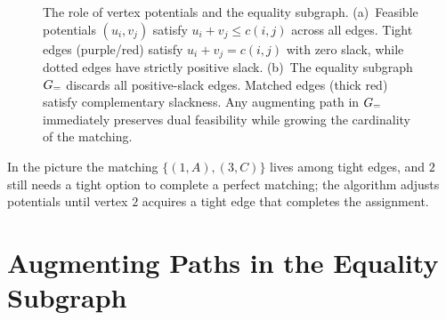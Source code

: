 \begin{figure}[H]
\caption{The role of vertex potentials and the equality subgraph. (a)~Feasible
potentials $(u_i, v_j)$ satisfy $u_i + v_j \le c(i,j)$ across all edges. Tight
edges (purple/red) satisfy $u_i + v_j = c(i,j)$ with zero slack, while dotted
edges have strictly positive slack. (b)~The equality subgraph $G_=$ discards
all positive-slack edges. Matched edges (thick red) satisfy complementary slackness.
Any augmenting path in $G_=$ immediately preserves dual feasibility while
growing the cardinality of the matching.}
\label{ch16:fig-equality-subgraph}
\end{figure}

In the picture the matching $\{(1,A),(3,C)\}$ lives among tight edges, and $2$ still needs a tight option to complete a perfect matching; the algorithm adjusts potentials until vertex $2$ acquires a tight edge that completes the assignment.

\section{Augmenting Paths in the Equality Subgraph}
\label{ch16:augment}

